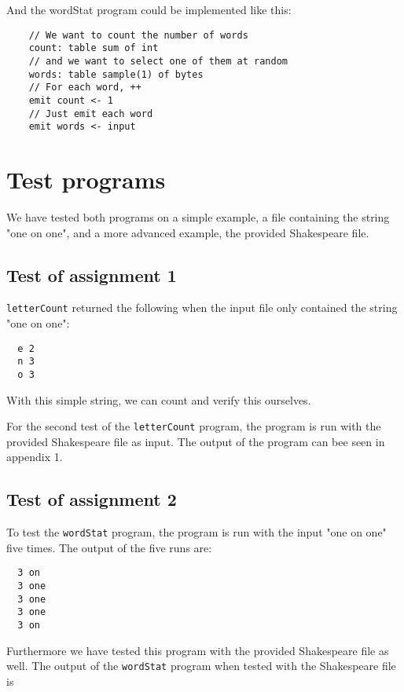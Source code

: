 \documentclass[10pt, a4paper]{article}
\begin{document}
And the wordStat program could be implemented like this:

\begin{lstlisting}
	// We want to count the number of words
	count: table sum of int
	// and we want to select one of them at random
	words: table sample(1) of bytes
	// For each word, ++
	emit count <- 1
	// Just emit each word
	emit words <- input
\end{lstlisting}


\section{Test programs}
We have tested both programs on a simple example, a file containing the string "one on one", and a more advanced example, the provided Shakespeare file.

\subsection{Test of assignment 1} %
\label{sub:assignment_1}
\texttt{letterCount} returned the following when the input file only contained the string "one on one":
\begin{verbatim}
  e	2
  n	3
  o	3
\end{verbatim}

With this simple string, we can count and verify this ourselves.

For the second test of the \texttt{letterCount} program, the program is run with the provided Shakespeare file as input. 
The output of the program can bee seen in appendix 1.

\subsection{Test of assignment 2} %
\label{sub:assignment_2}

To test the \texttt{wordStat} program, the program is run with the input "one on one" five times. 
The output of the five runs are:

\begin{verbatim}  
  3 on
  3 one
  3 one
  3 one    
  3 on  
\end{verbatim}

Furthermore we have tested this program with the provided Shakespeare file as well. 
The output of the \texttt{wordStat} program when tested with the Shakespeare file is
\end{document}
